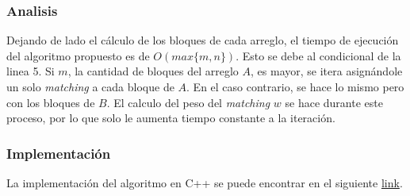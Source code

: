 \subsubsection*{Analisis}
Dejando de lado el cálculo de los bloques de cada arreglo, el tiempo de ejecución del algoritmo propuesto es de $O(max\{m,n\})$. Esto se debe al condicional de la linea 5. Si $m$, la cantidad de bloques del arreglo $A$, es mayor, se itera asignándole un solo \textit{matching} a cada bloque de $A$. En el caso contrario, se hace lo mismo pero con los bloques de $B$. El calculo del peso del \textit{matching} $w$ se hace durante este proceso, por lo que solo le aumenta tiempo constante a la iteración. 


\subsubsection*{Implementación}
La implementación del algoritmo en C++ se puede encontrar en el siguiente \href{https://github.com/Guillermo598/ProyectoADA/blob/master/Pregunta1.cpp}{link}.